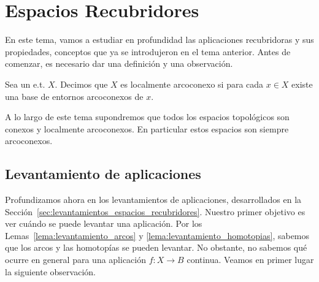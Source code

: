 \chapter{Espacios Recubridores}

En este tema, vamos a estudiar en profundidad las aplicaciones recubridoras y sus propiedades, conceptos que ya se introdujeron en el tema anterior. Antes de comenzar, es necesario dar una definición y una observación.

\begin{definicion}
    Sea un e.t. $X$. Decimos que $X$ es localmente arcoconexo si para cada $x\in X$ existe una base de entornos arcoconexos de $x$.
\end{definicion}

\begin{observacion}
    A lo largo de este tema supondremos que todos los espacios topológicos son conexos y localmente arcoconexos. En particular estos espacios son siempre arcoconexos.
\end{observacion}

\section{Levantamiento de aplicaciones}

Profundizamos ahora en los levantamientos de aplicaciones, desarrollados en la Sección~\ref{sec:levantamientos_espacios_recubridores}. Nuestro primer objetivo es ver cuándo se puede levantar una aplicación. Por los Lemas~\ref{lema:levantamiento_arcos} y \ref{lema:levantamiento_homotopias}, sabemos que los arcos y las homotopías se pueden levantar. No obstante, no sabemos qué ocurre en general para una aplicación $f:X\to B$ continua. Veamos en primer lugar la siguiente observación.

